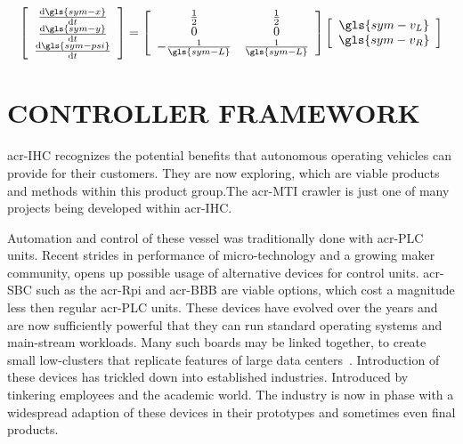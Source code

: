 \begin{equation}
    \label{eq:local_frame}
    \left[\begin{array}{c}
              \dv{\gls{sym-x}}{t} \\
              \dv{\gls{sym-y}}{t} \\
              \dv{\gls{sym-psi}}{t}
    \end{array}\right] = \left[\begin{array}{cc}
                                   \frac{1}{2}            & \frac{1}{2}           \\
                                   0                      & 0                     \\
                                   -\frac{1}{\gls{sym-L}} & \frac{1}{\gls{sym-L}}
    \end{array}\right] \left[\begin{array}{c}
                                 \gls{sym-v_L} \\
                                 \gls{sym-v_R}
    \end{array}\right]
\end{equation}


\section{CONTROLLER FRAMEWORK}\label{sec:controller}

\gls{acr-IHC} recognizes the potential benefits that autonomous operating vehicles can provide for their customers. They
are now exploring, which are viable products and methods within this product group.The \gls{acr-MTI} crawler is
just one of many projects being developed within \gls{acr-IHC}.

Automation and control of these vessel was traditionally done with \gls{acr-PLC} units. Recent strides in
performance of micro-technology and a growing maker community, opens up possible usage of alternative devices for
control units. \gls{acr-SBC} such as the \gls{acr-Rpi} and \gls{acr-BBB} are viable options, which
cost a magnitude less then regular \gls{acr-PLC} units. These devices have evolved over the years and are now
sufficiently powerful that they can run standard operating systems and main-stream workloads. Many such boards may be
linked together, to create small low-clusters that replicate features of large data
centers~\cite{johnston_commodity_2018}. Introduction of these devices has trickled down into established industries.
Introduced by tinkering employees and the academic world. The industry is now in phase with a widespread adaption of
these devices in their prototypes and sometimes even final products.

